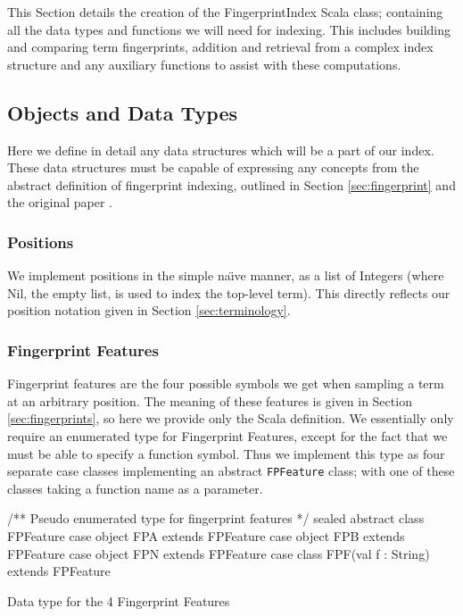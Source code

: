 This Section details the creation of the FingerprintIndex Scala class; containing
all the data types and functions we will need for indexing. This includes building
and comparing term fingerprints, addition and retrieval from a complex index structure
and any auxiliary functions to assist with these computations.

\subsection{Objects and Data Types}
\label{sec:datatypes}

Here we define in detail any data structures which will be a part of our index.
These data structures must be capable of expressing any concepts from
the abstract definition of fingerprint indexing, outlined in Section \ref{sec:fingerprint}
and the original paper \cite{shulz12}.

\subsubsection{Positions}

We implement positions in the simple na\"{\i}ve manner, as a list of
Integers (where Nil, the empty list,  is used to index the top-level term). This
directly reflects our position notation given in Section \ref{sec:terminology}.

\subsubsection{Fingerprint Features}

Fingerprint features are the four possible symbols we get when sampling a term
at an arbitrary position. The meaning of these features is given in Section \ref{sec:fingerprints},
so here we provide only the Scala definition. We essentially only require an
enumerated type for Fingerprint Features, except for the fact that we must be able
to specify a function symbol. Thus we implement this type as four separate case classes
implementing an abstract \verb!FPFeature! class; with one of these classes taking
a function name as a parameter.

\begin{listing}[H]
\begin{scalacode}
/** Pseudo enumerated type for fingerprint features */
sealed abstract class FPFeature
case object FPA extends FPFeature 
case object FPB extends FPFeature
case object FPN extends FPFeature
case class  FPF(val f : String) extends FPFeature
\end{scalacode}
\caption{Data type for the 4 Fingerprint Features \protect\cite[p5]{shulz12}}
\label{lst:featuredata}
\end{listing}

